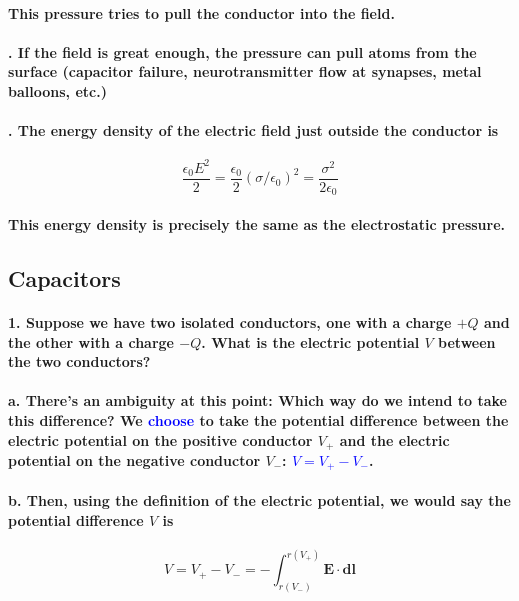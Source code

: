 \documentclass{article}
\begin{document}
\paragraph{\indent\indent This pressure tries to pull the conductor into the field.}
\paragraph{. If the field is great enough, the pressure can pull atoms from the surface (capacitor failure, neurotransmitter flow at synapses, metal balloons, etc.)}
\paragraph{. The energy density of the electric field just outside the conductor is}
\begin{equation*}
    \frac{\epsilon_0 E^2}{2}=\frac{\epsilon_0}{2}(\sigma/\epsilon_0)^2=\frac{\sigma^2}{2\epsilon_0}
\end{equation*}
\paragraph{\indent\indent This energy density is precisely the same as the electrostatic pressure.}
\subsection{Capacitors}
\paragraph{1. Suppose we have two isolated conductors, one with a charge $+Q$ and the other with a charge $-Q$. What is the electric potential $V$ between the two conductors?}
\paragraph{\indent a. There's an ambiguity at this point: Which way do we intend to take this difference? We \textcolor{blue}{choose} to take the potential difference between the electric potential on the positive conductor $V_+$ and the electric potential on the negative conductor $V_-$: \textcolor{blue}{$V=V_+-V_-$}.}
\paragraph{\indent b. Then, using the definition of the electric potential, we would say the potential difference $V$ is}
\begin{equation*}
    V=V_+-V_-=-\int_{r(V_-)}^{r(V_+)}\boldsymbol{E}\cdot\boldsymbol{dl}
\end{equation*}
\end{document}
